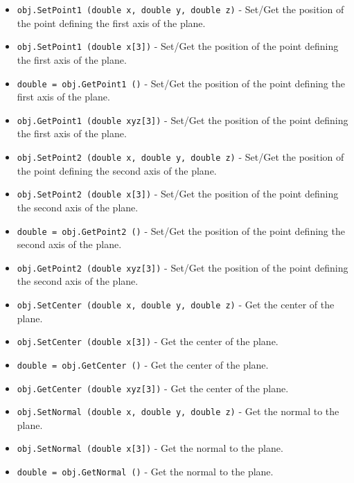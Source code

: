 \begin{itemize}
\item  \verb|obj.SetPoint1 (double x, double y, double z)| -  Set/Get the position of the point defining the first axis of the plane.

\item  \verb|obj.SetPoint1 (double x[3])| -  Set/Get the position of the point defining the first axis of the plane.

\item  \verb|double = obj.GetPoint1 ()| -  Set/Get the position of the point defining the first axis of the plane.

\item  \verb|obj.GetPoint1 (double xyz[3])| -  Set/Get the position of the point defining the first axis of the plane.

\item  \verb|obj.SetPoint2 (double x, double y, double z)| -  Set/Get the position of the point defining the second axis of the plane.

\item  \verb|obj.SetPoint2 (double x[3])| -  Set/Get the position of the point defining the second axis of the plane.

\item  \verb|double = obj.GetPoint2 ()| -  Set/Get the position of the point defining the second axis of the plane.

\item  \verb|obj.GetPoint2 (double xyz[3])| -  Set/Get the position of the point defining the second axis of the plane.

\item  \verb|obj.SetCenter (double x, double y, double z)| -  Get the center of the plane.

\item  \verb|obj.SetCenter (double x[3])| -  Get the center of the plane.

\item  \verb|double = obj.GetCenter ()| -  Get the center of the plane.

\item  \verb|obj.GetCenter (double xyz[3])| -  Get the center of the plane.

\item  \verb|obj.SetNormal (double x, double y, double z)| -  Get the normal to the plane.

\item  \verb|obj.SetNormal (double x[3])| -  Get the normal to the plane.

\item  \verb|double = obj.GetNormal ()| -  Get the normal to the plane.


\end{itemize}
